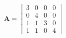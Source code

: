 \documentclass[12 pt]{slides}
\begin{document}
\begingroup
\[\textbf{A} = \begin{bmatrix}3 & 0 & 0 & 0\\
0 & 4 & 0 & 0\\
1 & 1 & 3 & 0\\
1 & 1 & 0 & 4\end{bmatrix}\]
\endgroup
\end{document}
